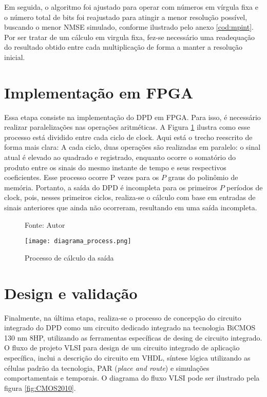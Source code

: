 Em seguida, o algoritmo foi ajustado para operar com números em vírgula fixa e o número total de bits foi reajustado para atingir a menor resolução possível, buscando o menor NMSE simulado, conforme ilustrado pelo anexo \ref{cod:mpint}. Por ser tratar de um cálculo em virgula fixa, fez-se necessário uma readequação do resultado obtido entre cada multiplicação de forma a manter a resolução inicial.

\section{Implementação em FPGA}
Essa etapa consiste na implementação do DPD em FPGA. Para isso, é necessário realizar paralelizações nas operações aritméticas. A Figura \ref{fig:diagramaprocess} ilustra como esse processo está dividido entre cada ciclo de clock. Aqui está o trecho reescrito de forma mais clara: A cada ciclo, duas operações são realizadas em paralelo: o sinal atual é elevado ao quadrado e registrado, enquanto ocorre o somatório do produto entre os sinais do mesmo instante de tempo e seus respectivos coeficientes. Esse processo ocorre P vezes para os \( P \) graus do polinômio de memória. Portanto, a saída do DPD é incompleta para os primeiros \( P \) períodos de clock, pois, nesses primeiros ciclos, realiza-se o cálculo com base em entradas de sinais anteriores que ainda não ocorreram, resultando em uma saída incompleta.

\begin{figure}[ht!]
  \centering
  \captionsetup{justification=centering}
  \caption*{Fonte: Autor}
  \texttt{[image: diagrama\_process.png]}
  \caption{Processo de cálculo da saída}
  \label{fig:diagramaprocess}
\end{figure}

\section{Design e validação}
Finalmente, na última etapa, realiza-se o processo de concepção do circuito integrado do DPD como um circuito dedicado integrado na tecnologia BiCMOS 130 nm 8HP, utilizando as ferramentas específicas de desing de circuito integrado.
O fluxo de projeto VLSI para design de um circuito integrado de aplicação específica, inclui a descrição do circuito em VHDL, síntese lógica utilizando as células padrão da tecnologia, PAR (\textit{place and route}) e simulações comportamentais e temporais. O diagrama do fluxo VLSI pode ser ilustrado pela figura \ref{fig:CMOS2010}.

